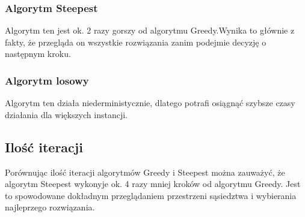 \subsubsection{Algorytm Steepest}

Algorytm ten jest ok. 2 razy gorszy od algorytmu Greedy.Wynika to głównie z fakty, że przegląda on
wszystkie rozwiązania zanim podejmie decyzję o następnym kroku. 

\subsubsection{Algorytm losowy}

Algorytm ten działa niederministycznie, dlatego potrafi osiągnąć szybsze czasy działania dla 
większych instancji. 

\subsection{Ilość iteracji}

Porównując ilość iteracji algorytmów Greedy i Steepest można zauważyć, że algorytm 
Steepest wykonyje ok. 4 razy mniej kroków od algorytmu Greedy. Jest to spowodowane 
dokładnym przeglądaniem przestrzeni sąsiedztwa i wybierania najleprzego rozwiązania.
